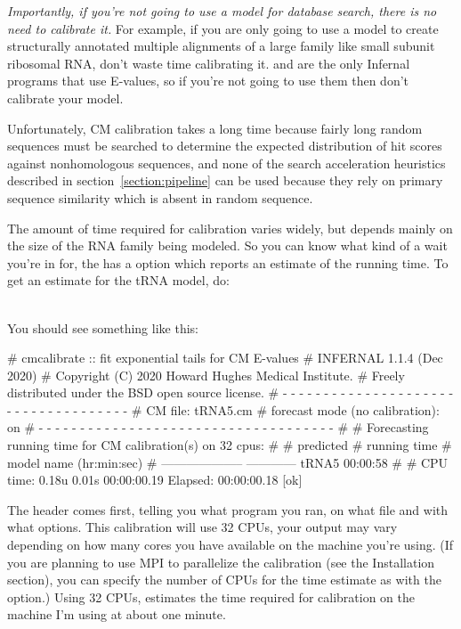 \emph{Importantly, if you're not going to use a model for database
search, there is no need to calibrate it.} For example, if you are
only going to use a model to create structurally annotated multiple
alignments of a large family like small subunit ribosomal RNA, don't
waste time calibrating it.  and  are the
only Infernal programs that use E-values, so if you're not going to
use them then don't calibrate your model.

Unfortunately, CM calibration takes a long time because fairly long
random sequences must be searched to determine the expected
distribution of hit scores against nonhomologous sequences, and none
of the search acceleration heuristics described in
section~\ref{section:pipeline} can be used because they rely on
primary sequence similarity which is absent in random sequence.

The amount of time required for calibration varies widely, but
depends mainly on the size of the RNA family being modeled.
So you can know what kind of a wait you're in for, the
 has a  option which reports an
estimate of the running time. To get an estimate for the tRNA model, do:

\\

You should see something like this:

\begin{sreoutput}
# cmcalibrate :: fit exponential tails for CM E-values
# INFERNAL 1.1.4 (Dec 2020)
# Copyright (C) 2020 Howard Hughes Medical Institute.
# Freely distributed under the BSD open source license.
# - - - - - - - - - - - - - - - - - - - - - - - - - - - - - - - - - - - -
# CM file:                                     tRNA5.cm
# forecast mode (no calibration):              on
# - - - - - - - - - - - - - - - - - - - - - - - - - - - - - - - - - - - -
#
# Forecasting running time for CM calibration(s) on 32 cpus:
#
#                          predicted
#                       running time
# model name            (hr:min:sec)
# --------------------  ------------
  tRNA5                     00:00:58
#
# CPU time: 0.18u 0.01s 00:00:00.19 Elapsed: 00:00:00.18
[ok]
\end{sreoutput}

The header comes first, telling you what program you ran, on what file
and with what options. This calibration will use 32 CPUs, your output
may vary depending on how many cores you have available on the machine
you're using. (If you are planning to use MPI to parallelize the
calibration (see the Installation section), you can specify the number
of CPUs for the time estimate as  with the
 option.) Using 32 CPUs, 
estimates the time required for calibration on the machine I'm using
at about one minute.

